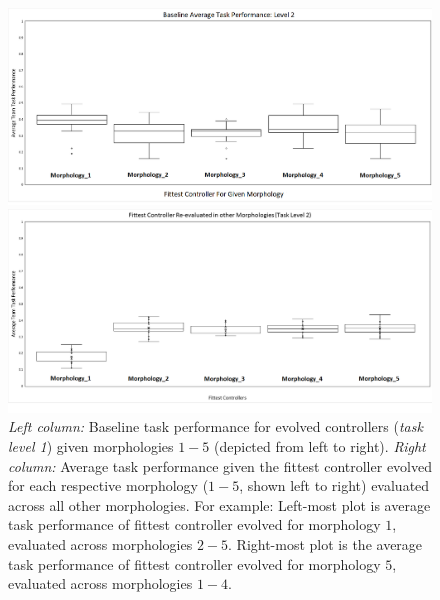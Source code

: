 \begin{figure}[t]
	\begin{minipage}{0.5\textwidth}
		\includegraphics[width=\textwidth]{Figures/Results/Baseline Calc Phase/Baseline_Level_2.png}
	\end{minipage}
	\begin{minipage}{0.5\textwidth}
		\includegraphics[width=\textwidth]{Figures/Results/Evaluation Phase/Average_Eval_Level_2.png}
	\end{minipage}
\caption{\textit{Left column:} Baseline task performance for evolved controllers (\textit{task level 1})
given morphologies $1-5$ (depicted from left to right).
\textit{Right column:} Average task performance given the fittest controller evolved
for each respective morphology ($1-5$, shown left to right) evaluated across all other morphologies.
For example: Left-most plot is average task performance of fittest controller evolved for
morphology $1$, evaluated across morphologies $2-5$.  Right-most plot is the average task performance
of fittest controller evolved for morphology $5$, evaluated across morphologies $1-4$.}\label{fig:level2results}
\end{figure}


